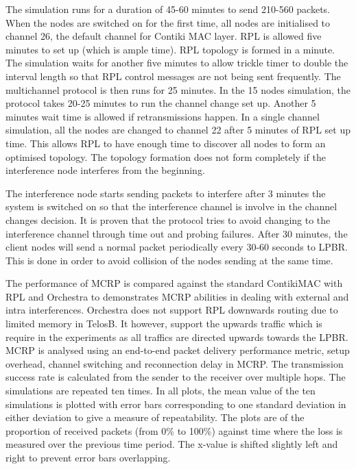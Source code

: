 The simulation runs for a duration of 45-60 minutes to send 210-560 packets. When the nodes are switched on for the first time, all nodes are initialised to channel 26, the default channel for Contiki MAC layer. RPL is allowed five minutes to set up (which is ample time). RPL topology is formed in a minute. The simulation waits for another five minutes to allow trickle timer to double the interval length so that RPL control messages are not being sent frequently. The multichannel protocol is then runs for 25 minutes. In the 15 nodes simulation, the protocol takes 20-25 minutes to run the channel change set up. Another 5 minutes wait time is allowed if retransmissions happen. 
In a single channel simulation, all the nodes are changed to channel 22 after 5 minutes of RPL set up time. This allows RPL to have enough time to discover all nodes to form an optimised topology. The topology formation does not form completely if the interference node interferes from the beginning. 

The interference node starts sending packets to interfere after 3 minutes the system is switched on so that the interference channel is involve in the channel changes decision. It is proven that the protocol tries to avoid changing to the interference channel through time out and probing failures. After 30 minutes, the client nodes will send a normal packet periodically every 30-60 seconds to LPBR. This is done in order to avoid collision of the nodes sending at the same time. 

The performance of MCRP is compared against the standard ContikiMAC with RPL and Orchestra to demonstrates MCRP abilities in dealing with external and intra interferences. Orchestra does not support RPL downwards routing due to limited memory in TelosB. It however, support the upwards traffic which is require in the experiments as all traffics are directed upwards towards the LPBR.
MCRP is analysed using an end-to-end packet delivery performance metric, setup overhead, channel switching and reconnection delay in MCRP. The transmission success rate is calculated from the sender to the receiver over multiple hops. 
The simulations are repeated ten times. In all plots, the mean value of the ten simulations is plotted with error bars corresponding to one standard deviation in either deviation to give a measure of repeatability. The plots are of the proportion of received packets (from 0\% to 100\%) against time where the loss is measured over the previous time period.  The x-value is shifted slightly left and right to prevent error bars overlapping.


